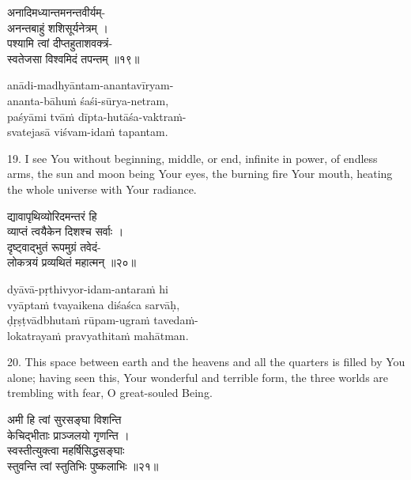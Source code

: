 \begin{gitaverse}
अनादिमध्यान्तमनन्तवीर्यम्- \\
\tab अनन्तबाहुं शशिसूर्यनेत्रम् । \\
पश्यामि त्वां दीप्तहुताशवक्त्रं- \\
\tab स्वतेजसा विश्वमिदं तपन्तम् ॥१९॥
\end{gitaverse}

\begin{transliteration}
anādi-madhyāntam-anantavīryam- \\
\tab ananta-bāhuṁ śaśi-sūrya-netram, \\
paśyāmi tvāṁ dīpta-hutāśa-vaktraṁ- \\
\tab svatejasā viśvam-idaṁ tapantam.
\end{transliteration}

19. I see You without beginning, middle, or end, infinite in power, of endless
arms, the sun and moon being Your eyes, the burning fire Your mouth, heating
the whole universe with Your radiance.

\begin{gitaverse}
द्यावापृथिव्योरिदमन्तरं हि \\
\tab व्याप्तं त्वयैकेन दिशश्च सर्वाः । \\
दृष्ट्वाद्भुतं रूपमुग्रं तवेदं- \\
\tab लोकत्रयं प्रव्यथितं महात्मन् ॥२०॥
\end{gitaverse}

\begin{transliteration}
dyāvā-pṛthivyor-idam-antaraṁ hi \\
\tab vyāptaṁ tvayaikena diśaśca sarvāḥ, \\
ḍṛṣṭvādbhutaṁ rūpam-ugraṁ tavedaṁ- \\
\tab lokatrayaṁ pravyathitaṁ mahātman.
\end{transliteration}

20. This space between earth and the heavens and all the quarters is filled by
You alone; having seen this, Your wonderful and terrible form, the three worlds
are trembling with fear, O great-souled Being.

\begin{gitaverse}
अमी हि त्वां सुरसङ्घा विशन्ति \\
\tab केचिद्भीताः प्राञ्जलयो गृणन्ति । \\
स्वस्तीत्युक्त्वा महर्षिसिद्धसङ्घाः \\
\tab स्तुवन्ति त्वां स्तुतिभिः पुष्कलाभिः ॥२१॥
\end{gitaverse}

